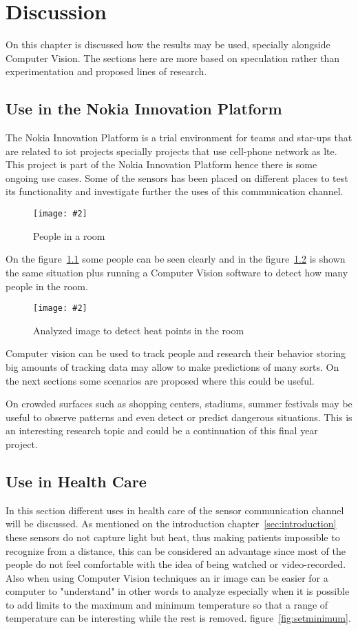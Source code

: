 \documentclass[hidelinks,11pt,a4paper,oneside,article]{memoir}
\newcommand{\putimage}[3][10] %
{
\begin{figure}[h]
	\centering
	\captionsetup{justification=centering}
	\texttt{[image: \#2]}
	\caption{#3}
	\label{fig:#2}
\end{figure}
}
\begin{document}
\clearpage\chapter{Discussion}\label{sec:discussion}
On this chapter is discussed how the results may be used, specially alongside Computer Vision. The sections here are more based on speculation rather than experimentation and proposed lines of research.

\section{Use in the Nokia Innovation Platform}\label{sec:use-in-the-nokia-innovation-platform}
The Nokia Innovation Platform is a trial environment for teams and star-ups that are related to \gls{iot} projects specially projects that use cell-phone network as \gls{lte}. This project is part of the Nokia Innovation Platform hence there is some ongoing use cases. Some of the sensors has been placed on different places to test its functionality and investigate further the uses of this communication channel.

	\putimage{people}{People in a room}
	
On the figure~\ref{fig:people} some people can be seen clearly and in the figure~\ref{fig:analysed} is shown the same situation plus running a Computer Vision software to detect how many people in the room.

	\putimage{analysed}{Analyzed image to detect heat points in the room}

Computer vision can be used to track people and research their behavior storing big amounts of tracking data may allow to make predictions of many sorts. On the next sections some scenarios are proposed where this could be useful.

On crowded surfaces such as shopping centers, stadiums, summer festivals may be useful to observe patterns and even detect or predict dangerous situations. This is an interesting research topic and could be a continuation of this final year project.


\section{Use in Health Care}
In this section different uses in health care of the sensor communication channel will be discussed. As mentioned on the introduction chapter~\ref{sec:introduction} these sensors do not capture light but heat, thus making patients impossible to recognize from a distance, this can be considered an advantage since most of the people do not feel comfortable with the idea of being watched or video-recorded. Also when using Computer Vision techniques an \gls{ir} image can be easier for a computer to "understand" in other words to analyze especially when it is possible to add limits to the maximum and minimum temperature so that a range of temperature can be interesting while the rest is removed. figure~\ref{fig:setminimum}.
    
\end{document}

